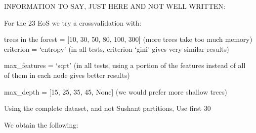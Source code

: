 INFORMATION TO SAY, JUST HERE AND NOT WELL WRITTEN:

For the 23 EoS we try a crossvalidation with:

trees in the forest = [10, 30, 50, 80, 100, 300]  (more trees take too much memory)
criterion = ‘entropy’    (in all tests, criterion ‘gini’ gives very similar results)

max_features = ‘sqrt’ (in all tests, using a portion of the features instead of all of them in each node gives better results)

max_depth = [15, 25, 35, 45, None] (we would prefer more shallow trees)

Using the complete dataset, and not Sushant partitions, Use  first 30%

We obtain the following:

